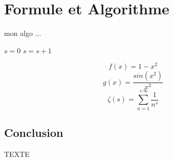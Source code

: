 \documentclass{article}
\begin{document}
\section{Formule et Algorithme}
\begin{algorithm}[H]
\caption{mon algo ...}
\begin{algorithmic}[1]
\STATE $s =0$
\STATE $s= s + 1$
\ENDIF
\ENDFOR
\end{algorithmic}
\end{algorithm}

\begin{equation}
f(x)=1 - x^2
\end{equation}
\begin{equation}
g(x)=\frac{sin(x^2)}{x^3}
\end{equation}
\begin{equation}
\zeta(s)= \sum_{n=1}^{+\infty}\frac1{n^s}
\end{equation}

\subsection{Conclusion}
TEXTE
\end{document}
